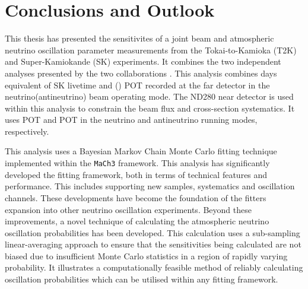 \chapter{Conclusions and Outlook}

This thesis has presented the sensitivites of a joint beam and atmospheric neutrino oscillation parameter measurements from the Tokai-to-Kamioka (T2K) and Super-Kamiokande (SK) experiments. It combines the two independent analyses presented by the two collaborations \cite{Dunne2020-uf,Jiang2019-iw}. This analysis combines  days equivalent of SK livetime and () POT recorded at the far detector in the neutrino(antineutrino) beam operating mode. The ND280 near detector is used within this analysis to constrain the beam flux and cross-section systematics. It uses POT and POT in the neutrino and antineutrino running modes, respectively.


This analysis uses a Bayesian Markov Chain Monte Carlo fitting technique implemented within the \texttt{MaCh3} framework. This analysis has significantly developed the fitting framework, both in terms of technical features and performance. This includes supporting new samples, systematics and oscillation channels. These developments have become the foundation of the fitters expansion into other neutrino oscillation experiments. Beyond these improvements, a novel technique of calculating the atmospheric neutrino oscillation probabilities has been developed. This calculation uses a sub-sampling linear-averaging approach to ensure that the sensitivities being calculated are not biased due to insufficient Monte Carlo statistics in a region of rapidly varying probability. It illustrates a computationally feasible method of reliably calculating oscillation probabilities which can be utilised within any fitting framework.



